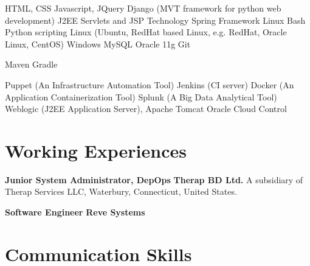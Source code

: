 \documentclass[11pt,a4paper,sans]{moderncv}
\begin{document}
{
HTML, CSS
\newline Javascript, JQuery
\newline Django (MVT framework for python web development)
\newline J2EE Servlets and JSP Technology
\newline Spring Framework
}
{
Linux Bash
\newline Python scripting
}
{
Linux (Ubuntu, RedHat based Linux, e.g. RedHat, Oracle Linux, CentOS)
\newline Windows
}
{
MySQL
\newline Oracle 11g
}
{
Git
}

{
Maven
\newline Gradle
}

{
Puppet (An Infrastructure Automation Tool)
\newline Jenkins (CI server)
\newline Docker (An Application Containerization Tool)
\newline Splunk (A Big Data Analytical Tool)
\newline Weblogic (J2EE Application Server), Apache Tomcat
\newline Oracle Cloud Control
}


\section{Working Experiences}
{
\textbf{Junior System Administrator, DepOps\newline}
\textbf{Therap BD Ltd.\newline}
A subsidiary of Therap Services LLC, Waterbury, Connecticut, United States.
}

{
\textbf{Software Engineer\newline}
\textbf{Reve Systems\newline}
}



\section{Communication Skills}


\end{document}
